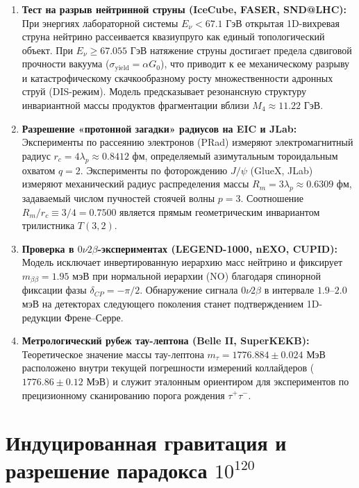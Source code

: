 \documentclass[12pt,a4paper]{article}
\begin{document}
	\begin{enumerate}
		\item \textbf{Тест на разрыв нейтринной струны (IceCube, FASER, SND@LHC):}
		При энергиях лабораторной системы $E_\nu < 67.1$ ГэВ открытая 1D-вихревая струна нейтрино рассеивается квазиупруго как единый топологический объект. При $E_\nu \ge 67.055$ ГэВ натяжение струны достигает предела сдвиговой прочности вакуума ($\sigma_{\text{yield}} = \alpha G_0$), что приводит к ее механическому разрыву и катастрофическому скачкообразному росту множественности адронных струй (DIS-режим). Модель предсказывает резонансную структуру инвариантной массы продуктов фрагментации вблизи $M_4 \approx 11.22$ ГэВ.
		
		\item \textbf{Разрешение «протонной загадки» радиусов на EIC и JLab:}
		Эксперименты по рассеянию электронов (PRad) измеряют электромагнитный радиус $r_c = 4\lambda_p \approx 0.8412$ фм, определяемый азимутальным тороидальным охватом $q=2$. Эксперименты по фоторождению $J/\psi$ (GlueX, JLab) измеряют механический радиус распределения массы $R_m = 3\lambda_p \approx 0.6309$ фм, задаваемый числом пучностей стоячей волны $p=3$. Соотношение $R_m / r_c \equiv 3/4 = 0.7500$ является прямым геометрическим инвариантом трилистника $T(3,2)$.
		
		\item \textbf{Проверка в $0\nu 2\beta$-экспериментах (LEGEND-1000, nEXO, CUPID):}
		Модель исключает инвертированную иерархию масс нейтрино и фиксирует $m_{\beta\beta} = \mathbf{1.95 \text{ мэВ}}$ при нормальной иерархии (NO) благодаря спинорной фиксации фазы $\delta_{CP} = -\pi/2$. Обнаружение сигнала $0\nu 2\beta$ в интервале $1.9\text{--}2.0$ мэВ на детекторах следующего поколения станет подтверждением 1D-редукции Френе--Серре.
		
		\item \textbf{Метрологический рубеж тау-лептона (Belle II, SuperKEKB):}
		Теоретическое значение массы тау-лептона $m_\tau = \mathbf{1776.884 \pm 0.024 \text{ МэВ}}$ расположено внутри текущей погрешности измерений коллайдеров ($1776.86 \pm 0.12$ МэВ) и служит эталонным ориентиром для экспериментов по прецизионному сканированию порога рождения $\tau^+\tau^-$.
	\end{enumerate}
	
	\section{Индуцированная гравитация и разрешение парадокса $10^{120}$}
	
\end{document}
